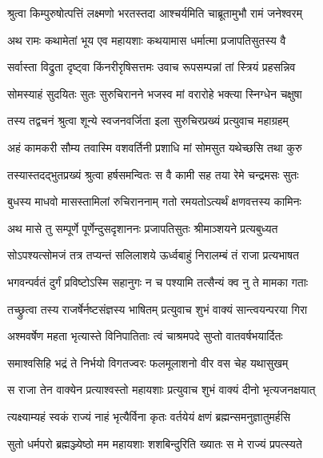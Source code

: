 \twolineshloka
{श्रुत्वा किम्पुरुषोत्पत्तिं लक्ष्मणो भरतस्तदा}
{आश्चर्यमिति चाब्रूतामुभौ रामं जनेश्वरम्} %

\twolineshloka
{अथ रामः कथामेतां भूय एव महायशाः}
{कथयामास धर्मात्मा प्रजापतिसुतस्य वै} %

\twolineshloka
{सर्वास्ता विद्रुता दृष्ट्वा किंनरीरृषिसत्तमः}
{उवाच रूपसम्पन्नां तां स्त्रियं प्रहसन्निव} %

\twolineshloka
{सोमस्याहं सुदयितः सुतः सुरुचिरानने}
{भजस्व मां वरारोहे भक्त्या स्निग्धेन चक्षुषा} %

\twolineshloka
{तस्य तद्वचनं श्रुत्वा शून्ये स्वजनवर्जिता}
{इला सुरुचिरप्रख्यं प्रत्युवाच महाग्रहम्} %

\twolineshloka
{अहं कामकरी सौम्य तवास्मि वशवर्तिनी}
{प्रशाधि मां सोमसुत यथेच्छसि तथा कुरु} %

\twolineshloka
{तस्यास्तदद्भुतप्रख्यं श्रुत्वा हर्षसमन्वितः}
{स वै कामी सह तया रेमे चन्द्रमसः सुतः} %

\twolineshloka
{बुधस्य माधवो मासस्तामिलां रुचिराननाम्}
{गतो रमयतोऽत्यर्थं क्षणवत्तस्य कामिनः} %

\twolineshloka
{अथ मासे तु सम्पूर्णे पूर्णेन्दुसदृशाननः}
{प्रजापतिसुतः श्रीमाञ्शयने प्रत्यबुध्यत} %

\twolineshloka
{सोऽपश्यत्सोमजं तत्र तप्यन्तं सलिलाशये}
{ऊर्ध्वबाहुं निरालम्बं तं राजा प्रत्यभाषत} %

\twolineshloka
{भगवन्पर्वतं दुर्गं प्रविष्टोऽस्मि सहानुगः}
{न च पश्यामि तत्सैन्यं क्व नु ते मामका गताः} %

\twolineshloka
{तच्छ्रुत्वा तस्य राजर्षेर्नष्टसंज्ञस्य भाषितम्}
{प्रत्युवाच शुभं वाक्यं सान्त्वयन्परया गिरा} %

\twolineshloka
{अश्मवर्षेण महता भृत्यास्ते विनिपातिताः}
{त्वं चाश्रमपदे सुप्तो वातवर्षभयार्दितः} %

\twolineshloka
{समाश्वसिहि भद्रं ते निर्भयो विगतज्वरः}
{फलमूलाशनो वीर वस चेह यथासुखम्} %

\twolineshloka
{स राजा तेन वाक्येन प्रत्याश्वस्तो महायशाः}
{प्रत्युवाच शुभं वाक्यं दीनो भृत्यजनक्षयात्} %

\twolineshloka
{त्यक्ष्याम्यहं स्वकं राज्यं नाहं भृत्यैर्विना कृतः}
{वर्तयेयं क्षणं ब्रह्मन्समनुज्ञातुमर्हसि} %

\twolineshloka
{सुतो धर्मपरो ब्रह्मञ्ज्येष्ठो मम महायशाः}
{शशबिन्दुरिति ख्यातः स मे राज्यं प्रपत्स्यते} %

